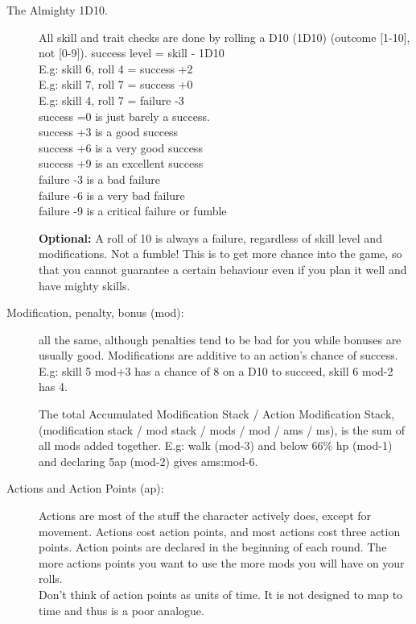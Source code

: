 \begin{description}

\item[The Almighty 1D10.] All skill and trait checks are done by rolling a D10 (1D10) (outcome [1-10], not [0-9]).
success level = skill - 1D10 \\
E.g: skill 6, roll 4 = success +2 \\
E.g: skill 7, roll 7 = success +0 \\
E.g: skill 4, roll 7 = failure -3 \\
success =0 is just barely a success. \\
success +3 is a good success \\
success +6 is a very good success \\
success +9 is an excellent success \\
failure -3 is a bad failure \\
failure -6 is a very bad failure \\
failure -9 is a critical failure or fumble

\textbf{Optional:} A roll of 10 is always a failure, regardless of skill level and modifications. Not a fumble! This is to get more chance into the game, so that you cannot guarantee a certain behaviour even if you plan it well and have mighty skills.

\item[Modification, penalty, bonus (mod):] all the same, although penalties tend to be bad for you while bonuses are usually good. Modifications are additive to an action's chance of success. \\
E.g: skill 5 mod+3 has a chance of 8 on a D10 to succeed, skill 6 mod-2 has 4.

The total Accumulated Modification Stack / Action Modification Stack, (modification stack / mod stack / mods / mod / ams / ms), is the sum of all mods added together.
E.g: walk (mod-3) and below 66\% hp (mod-1) and declaring 5ap (mod-2) gives ams:mod-6.

\item[Actions and Action Points (ap):]
Actions are most of the stuff the character actively does, except for movement. Actions cost action points, and most actions cost three action points.
Action points are declared in the beginning of each round. The more actions points you want to use the more mods you will have on your rolls.\\
Don't think of action points as units of time. It is not designed to map to time and thus is a poor analogue.


\end{description}
